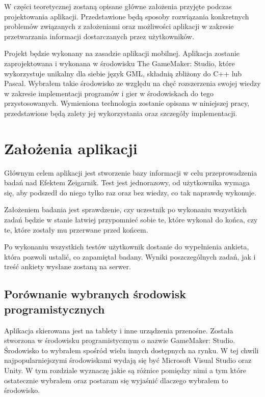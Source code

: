 \documentclass[openright]{xmgr}
\begin{document}
W części teoretycznej zostaną opisane główne założenia przyjęte podczas projektowania aplikacji. Przedstawione będą sposoby rozwiązania konkretnych problemów związanych z założeniami oraz możliwości aplikacji w zakresie przetwarzania informacji dostarczanych przez użytkowników.

Projekt będzie wykonany na zasadzie aplikacji mobilnej. Aplikacja zostanie zaprojektowana i wykonana w środowisku The GameMaker: Studio, które wykorzystuje unikalny dla siebie język GML, składnią zbliżony do C++ lub Pascal. Wybrałem takie środowisko ze względu na chęć rozszerzenia swojej wiedzy w zakresie implementacji programów i gier w środowiskach do tego przystosowanych. Wymieniona technologia zostanie opisana w niniejszej pracy, przedstawione będą zalety jej wykorzystania oraz szczegóły implementacji.




\chapter{Założenia aplikacji}
Głównym celem aplikacji jest stworzenie bazy informacji w celu przeprowadzenia badań nad Efektem Zeigarnik. Test jest jednorazowy, od użytkownika wymaga się, aby podszedł do niego tylko raz oraz bez wiedzy, co tak naprawdę wykonuje.

Założeniem badania jest sprawdzenie, czy uczestnik po wykonaniu wszystkich zadań będzie w stanie łatwiej przypomnieć sobie te, które wykonał do końca, czy te, które zostały mu przerwane przed końcem.

Po wykonaniu wszystkich testów użytkownik dostanie do wypełnienia ankieta, która pozwoli ustalić, co zapamiętał badany. Wyniki poszczególnych zadań, jak i treść ankiety wysłane zostaną na serwer.

\section{Porównanie wybranych środowisk programistycznych}
Aplikacja skierowana jest na tablety i inne urządzenia przenośne. Została stworzona w środowisku programistycznym o nazwie GameMaker: Studio. Środowisko to wybrałem spośród wielu innych dostępnych na rynku. W tej chwili najpopularniejszymi środowiskami wydają się być Microsoft Visual Studio oraz Unity. W tym rozdziale wyznaczę jakie są różnice pomiędzy nimi a tym które ostatecznie wybrałem oraz postaram się wyjaśnić dlaczego wybrałem to środowisko.
\end{document}
